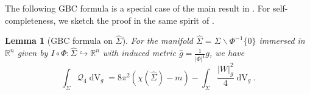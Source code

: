 \documentclass[11pt,letterpaper]{amsart}
\DeclareMathOperator{\dvol}{dV}
\newcommand{\mQ}{\mathcal{Q}}
\newcommand{\bR}{\mathbb{R}}
\newtheorem{lemma}[theorem]{Lemma}
\theoremstyle{definition}
\theoremstyle{remark}
\numberwithin{equation}{section}
\begin{document}
The following GBC formula is a special case of the main result in \cite[Theorem 1.5]{Li-Wang24}. For self-completeness, we sketch the proof in the same spirit of \cite{Chang-Qing-Yang00}.

\begin{lemma}[GBC formula on $\hat{\Sigma}$]\label{Gauss--Bonnet--Chern--formula}
    For the manifold $\hat{\Sigma}=\Sigma\backslash \Phi^{-1}\{0\}$ immersed in $\bR^n$ given by $I\circ \Phi: \hat{\Sigma}\hookrightarrow \bR^n$ with induced metric $\hat{g}=\frac{1}{|\Phi|^4}g$, we have
    \begin{equation}\label{complete-GBC}
    \int_{\Sigma}\mQ_4 \dvol_g=8\pi^2\left(\chi(\hat{\Sigma})-m\right)-\int_{\Sigma}\frac{|W|^2_g}{4}\dvol_g.
\end{equation}
\end{lemma}
\end{document}
